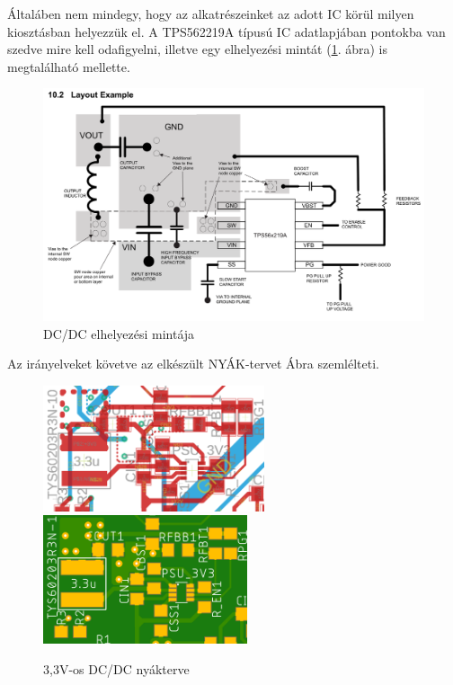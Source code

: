 \documentclass[../main.tex]{subfiles}
\begin{document}
            Általáben nem mindegy, hogy az alkatrészeinket az adott IC körül milyen kiosztásban helyezzük el. A TPS562219A típusú IC adatlapjában pontokba van szedve mire kell odafigyelni, illetve egy elhelyezési mintát (\ref{fig:tps_logl_example}. ábra) is megtalálható mellette.
            
            \begin{figure}[h!]
                \centering
                    \includegraphics[width=12cm]{resources/pcb_res/tps_logl_example.png}
                \caption{DC/DC elhelyezési mintája}
                \label{fig:tps_logl_example}
            \end{figure}
            
            Az irányelveket követve az elkészült NYÁK-tervet  Ábra szemlélteti.
            
            \begin{figure}[h!]
                \centering
                    \includegraphics[width=6.5cm]{resources/pcb_res/board_dcdc_3v3.png}
                    \includegraphics[width=6cm]{resources/pcb_res/pcb_dcdc_3v3.png}
                \caption{3,3V-os DC/DC nyákterve}
                \label{fig:pcb_3v3}
            \end{figure}
            
\end{document}
